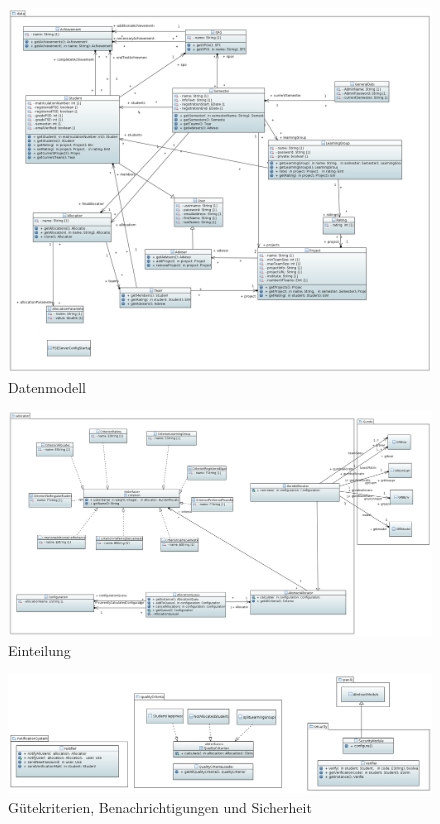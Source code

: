 \documentclass[parskip=full]{scrartcl}
\begin{document}
\begin{figure}[!htb]
\centering
\includegraphics[width=\linewidth]{bilder/daten.png}
\caption{Datenmodell}
\label{uml:data}
\end{figure}

\begin{figure}
\centering
\includegraphics[width=\linewidth]{bilder/einteilung.png}
\caption{Einteilung}
\label{uml:allocation}
\end{figure}

\begin{figure}
\centering
\includegraphics[width=\linewidth]{bilder/notifyGueteSecurity.png}
\caption{Gütekriterien, Benachrichtigungen und Sicherheit}
\label{uml:qualityNotifySecurity}
\end{figure}
\end{document}
